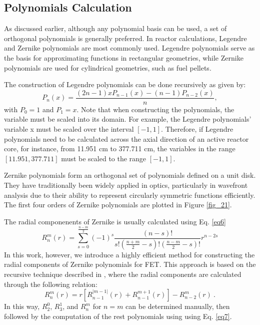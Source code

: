 \subsection{Polynomials Calculation} \label{sec22}

As discussed earlier, although any polynomial basis can be used, a set of orthogonal polynomials is generally preferred. In reactor calculations, Legendre and Zernike polynomials are most commonly used. Legendre polynomials serve as the basis for approximating functions in rectangular geometries, while Zernike polynomials are used for cylindrical geometries, such as fuel pellets.

The construction of Legendre polynomials can be done recursively as given by:
\begin{equation}
    P_n\left(x\right)=\frac{\left(2n-1\right)xP_{n-1}\left(x\right)-\left(n-1\right)P_{n-2}\left(x\right)}{n},
\end{equation}
with $P_0=1$ and $P_1=x$. Note that when constructing the polynomials, the variable must be scaled into its domain. For example, the Legendre polynomials' variable x must be scaled over the interval $[-1, 1]$. Therefore, if Legendre polynomials need to be calculated across the axial direction of an active reactor core, for instance, from 11.951 cm to 377.711 cm, the variables in the range $[11.951, 377.711]$ must be scaled to the range $[-1, 1]$.

Zernike polynomials form an orthogonal set of polynomials defined on a unit disk. They have traditionally been widely applied in optics, particularly in wavefront analysis due to their ability to represent circularly symmetric functions efficiently. The first four orders of Zernike polynomials are plotted in Figure \ref{fig_21}.

The radial componenents of Zernike is usually calculated using Eq. \ref{eq6}
\begin{equation}
R_n^m(r) = \sum_{s=0}^{\frac{n-m}{2}} (-1)^s \frac{(n-s)!}{s! \left( \frac{n+m}{2} - s \right)! \left( \frac{n-m}{2} - s \right)!} r^{n-2s}
\label{eq6}
\end{equation}
In this work, however, we introduce a highly efficient method for constructing the radial components of Zernike polynomials for FET. This approach is based on the recursive technique described in \cite{honarvar}, where the radial components are calculated through the following relation:
\begin{equation}
    R_n^m\left(r\right)=r\left[R_{n-1}^{\left|m-1\right|}\left(r\right)+R_{n-1}^{m+1}\left(r\right)\right]-R_{n-2}^m\left(r\right)\ .
    \label{eq7}
\end{equation}
In this way, $R_2^0$, $R_3^1$, and $R_n^m$ for $n=m$ can be determined manually, then followed by the computation of the rest polynomials using using Eq. \ref{eq7}.

